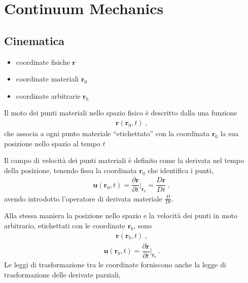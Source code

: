 \documentclass[letterpaper,10pt,english]{jupyterBook}
\begin{document}
\sphinxstepscope


\part{Continuum Mechanics}

\sphinxstepscope


\chapter{Cinematica}
\label{\detokenize{ch/continuum/kinematics:cinematica}}\label{\detokenize{ch/continuum/kinematics:continuum-kinematics}}\label{\detokenize{ch/continuum/kinematics::doc}}\begin{itemize}
\item {} 
\sphinxAtStartPar
coordinate fisiche \(\mathbf{r}\)

\item {} 
\sphinxAtStartPar
coordinate materiali \(\mathbf{r}_0\)

\item {} 
\sphinxAtStartPar
coordinate arbitrarie \(\mathbf{r}_b\)

\end{itemize}

\sphinxAtStartPar
Il moto dei punti materiali nello spazio fisico è descritto dalla una funzione
\begin{equation*}
\begin{split}\mathbf{r}(\mathbf{r}_0, t) \ ,\end{split}
\end{equation*}
\sphinxAtStartPar
che associa a ogni punto materiale “etichettato” con la coordinata \(\mathbf{r}_0\) la sua posizione nello spazio al tempo \(t\)

\sphinxAtStartPar
Il campo di velocità dei punti materiali è definito come la derivata nel tempo della posizione, tenendo fissa la coordinata \(\mathbf{r}_0\) che identifica i punti,
\begin{equation*}
\begin{split}\mathbf{u}(\mathbf{r}_0,t) = \dfrac{\partial \mathbf{r}}{\partial t}\bigg|_{\mathbf{r}_0} = \dfrac{D \mathbf{r}}{D t} \ ,\end{split}
\end{equation*}
\sphinxAtStartPar
avendo introdotto l’operatore di derivata materiale \(\frac{D}{Dt}\).

\sphinxAtStartPar
Alla stessa maniera la posizione nello spazio e la velocità dei punti in moto arbitrario, etichettati con le coordinate \(\mathbf{r}_b\), sono
\begin{equation*}
\begin{split}\mathbf{r}(\mathbf{r}_b, t) \ ,\end{split}
\end{equation*}\begin{equation*}
\begin{split}\mathbf{u}(\mathbf{r}_b,t) = \dfrac{\partial \mathbf{r}}{\partial t}\bigg|_{\mathbf{r}_b} \ .\end{split}
\end{equation*}
\sphinxAtStartPar
Le leggi di trasformazione tra le coordinate forniscono anche la legge di trasformazione delle derivate parziali,
\end{document}
